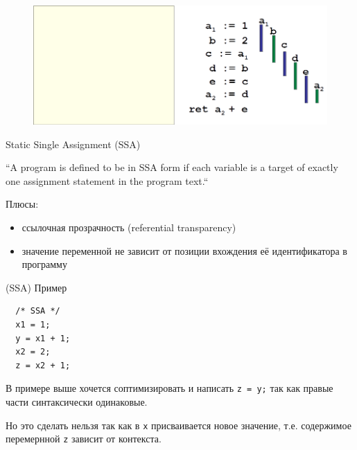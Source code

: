 \documentclass[aspectratio=169
  , xcolor={svgnames}
  , hyperref={ colorlinks,citecolor=DeepPink4
             , linkcolor=DarkRed,urlcolor=DarkBlue}
  , russian
  ]{beamer}
\theoremstyle{exerciseStyle1}
\begin{document}
\begin{frame}[fragile]{}
\begin{figure}
\centering
\includegraphics[width=0.9\paperwidth]{figures/quiz2}
\end{figure}

\end{frame}


\begin{frame}[fragile]{Static Single Assignment (SSA)}

\begin{definition}
``A program is defined to be in SSA form if each variable is a target of exactly one assignment statement in the program text.``
\end{definition}

Плюсы:
\begin{itemize}
\item ссылочная прозрачность (referential transparency)
\item значение переменной не зависит от позиции вхождения её идентификатора в программу
\end{itemize}
\end{frame}


\begin{frame}[fragile]{(SSA) Пример}
\hfill
\begin{minipage}[t]{0.48\linewidth}
  \begin{verbatim}
  /* SSA */
  x1 = 1;
  y = x1 + 1;
  x2 = 2;
  z = x2 + 1;
  \end{verbatim}
\end{minipage}\vspace{1em}

В примере выше хочется соптимизировать и написать \texttt{z = y;} так как правые части синтаксически одинаковые.

Но это сделать нельзя так как в \texttt{x} присваивается новое значение, т.е. содержимое перемернной \texttt{z} зависит от контекста.
\end{frame}
\end{document}
